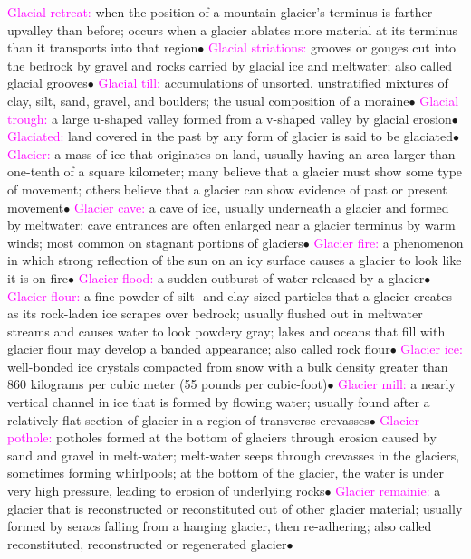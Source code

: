 \documentclass{article}
\newcommand{\ddd}{$\bullet$}
\newcommand{\pink}[1]{\textcolor{magenta}{#1}}
\newcommand{\vocab}[1]{{\pink{#1}}}
\begin{document}
\begin{multicols*}{4}
		\vocab{        Glacial retreat: } when the position of a mountain glacier's terminus is farther upvalley than before; occurs when a glacier ablates more material at its terminus than it transports into that region\ddd
		\vocab{        Glacial striations: } grooves or gouges cut into the bedrock by gravel and rocks carried by glacial ice and meltwater; also called glacial grooves\ddd
		\vocab{        Glacial till: } accumulations of unsorted, unstratified mixtures of clay, silt, sand, gravel, and boulders; the usual composition of a moraine\ddd
		\vocab{        Glacial trough: } a large u-shaped valley formed from a v-shaped valley by glacial erosion\ddd
		\vocab{        Glaciated: } land covered in the past by any form of glacier is said to be glaciated\ddd
		\vocab{        Glacier: } a mass of ice that originates on land, usually having an area larger than one-tenth of a square kilometer; many believe that a glacier must show some type of movement; others believe that a glacier can show evidence of past or present movement\ddd
		\vocab{        Glacier cave: } a cave of ice, usually underneath a glacier and formed by meltwater; cave entrances are often enlarged near a glacier terminus by warm winds; most common on stagnant portions of glaciers\ddd
		\vocab{        Glacier fire: } a phenomenon in which strong reflection of the sun on an icy surface causes a glacier to look like it is on fire\ddd
		\vocab{        Glacier flood: } a sudden outburst of water released by a glacier\ddd
		\vocab{        Glacier flour: } a fine powder of silt- and clay-sized particles that a glacier creates as its rock-laden ice scrapes over bedrock; usually flushed out in meltwater streams and causes water to look powdery gray; lakes and oceans that fill with glacier flour may develop a banded appearance; also called rock flour\ddd
		\vocab{        Glacier ice: } well-bonded ice crystals compacted from snow with a bulk density greater than 860 kilograms per cubic meter (55 pounds per cubic-foot)\ddd
		\vocab{        Glacier mill: } a nearly vertical channel in ice that is formed by flowing water; usually found after a relatively flat section of glacier in a region of transverse crevasses\ddd
		\vocab{        Glacier pothole: } potholes formed at the bottom of glaciers through erosion caused by sand and gravel in melt-water; melt-water seeps through crevasses in the glaciers, sometimes forming whirlpools; at the bottom of the glacier, the water is under very high pressure, leading to erosion of underlying rocks\ddd
		\vocab{        Glacier remainie: } a glacier that is reconstructed or reconstituted out of other glacier material; usually formed by seracs falling from a hanging glacier, then re-adhering; also called reconstituted, reconstructed or regenerated glacier\ddd

\end{multicols*}
\end{document}
